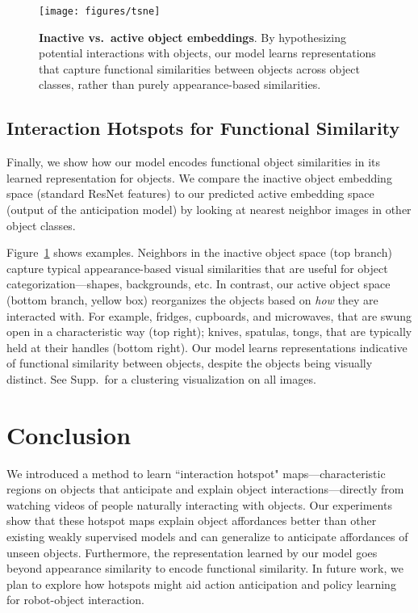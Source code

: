 \documentclass[10pt,twocolumn,letterpaper]{article}
\newcommand{\reffig}[1]{Figure~\ref{#1}}
\begin{document}
\begin{figure}[t]\centering
\texttt{[image: figures/tsne]}
\vspace*{-0.2in}\caption{\textbf{Inactive vs.~active object embeddings}. By hypothesizing potential interactions with objects, our model learns representations that capture functional similarities between objects across object classes, rather than purely appearance-based similarities.}
\label{fig:tsne}
\end{figure}

\subsection{Interaction Hotspots for Functional Similarity} \label{sec:dendo}
Finally, we show how our model encodes functional object similarities in its learned representation for objects. We compare the inactive object embedding space (standard ResNet features) to our predicted active embedding space (output of the anticipation model) by looking at nearest neighbor images in other object classes. 

\reffig{fig:tsne} shows examples.  Neighbors in the inactive object space (top branch) capture typical appearance-based visual similarities that are useful for object categorization---shapes, backgrounds, etc. In contrast, our active object space (bottom branch, yellow box) reorganizes the objects based on \emph{how} they are interacted with.  For example, fridges, cupboards, and microwaves, that are swung open in a characteristic way (top right); knives, spatulas, tongs, that are typically held at their handles (bottom right). Our model learns representations indicative of functional similarity between objects, despite the objects being visually distinct.
See Supp.~for a clustering visualization on all images.






 \section{Conclusion}

We introduced a method to learn ``interaction hotspot" maps---characteristic regions on objects that anticipate and explain object interactions---directly from watching videos of people naturally interacting with objects. 
Our experiments show that these hotspot maps explain object affordances better than other existing weakly supervised models and can generalize to anticipate affordances of unseen objects.  Furthermore, the representation learned by our model goes beyond appearance similarity to encode  functional similarity.  In future work, we plan to explore how hotspots might aid action anticipation and policy learning for robot-object interaction.
\end{document}
